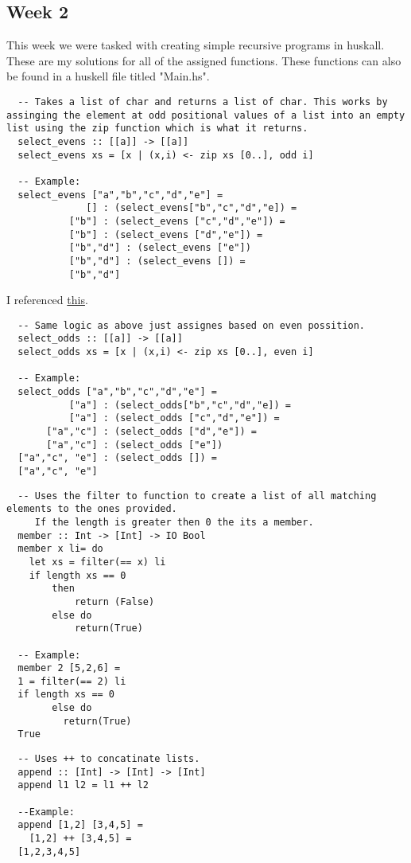 \documentclass{article}
\theoremstyle{theorem}
\theoremstyle{definition}
\theoremstyle{remark}
\begin{document}
\subsection{Week 2}
This week we were tasked with creating simple recursive programs in huskall. These are my solutions for all of the assigned functions. These functions can also be found in a huskell
file titled "Main.hs".
\begin{lstlisting}
  -- Takes a list of char and returns a list of char. This works by assinging the element at odd positional values of a list into an empty list using the zip function which is what it returns.
  select_evens :: [[a]] -> [[a]]
  select_evens xs = [x | (x,i) <- zip xs [0..], odd i]

  -- Example:
  select_evens ["a","b","c","d","e"] =
              [] : (select_evens["b","c","d","e]) = 
           ["b"] : (select_evens ["c","d","e"]) = 
           ["b"] : (select_evens ["d","e"]) = 
           ["b","d"] : (select_evens ["e"])
           ["b","d"] : (select_evens []) =
           ["b","d"]

\end{lstlisting}
I referenced \href{https://stackoverflow.com/questions/49741305/how-to-pick-elements-in-even-index-and-odd-index}{this}.
\begin{lstlisting}
  -- Same logic as above just assignes based on even possition.
  select_odds :: [[a]] -> [[a]]
  select_odds xs = [x | (x,i) <- zip xs [0..], even i]

  -- Example:
  select_odds ["a","b","c","d","e"] = 
           ["a"] : (select_odds["b","c","d","e]) = 
           ["a"] : (select_odds ["c","d","e"]) = 
       ["a","c"] : (select_odds ["d","e"]) = 
       ["a","c"] : (select_odds ["e"])
  ["a","c", "e"] : (select_odds []) =
  ["a","c", "e"]
\end{lstlisting}
\begin{lstlisting}
  -- Uses the filter to function to create a list of all matching elements to the ones provided.
     If the length is greater then 0 the its a member.
  member :: Int -> [Int] -> IO Bool
  member x li= do
    let xs = filter(== x) li
    if length xs == 0
        then 
            return (False)
        else do
            return(True)
    
  -- Example: 
  member 2 [5,2,6] =
  1 = filter(== 2) li
  if length xs == 0
        else do
          return(True)
  True
\end{lstlisting}
\begin{lstlisting}
  -- Uses ++ to concatinate lists.
  append :: [Int] -> [Int] -> [Int]
  append l1 l2 = l1 ++ l2 

  --Example:
  append [1,2] [3,4,5] = 
    [1,2] ++ [3,4,5] =
  [1,2,3,4,5]
\end{lstlisting}
\end{document}
